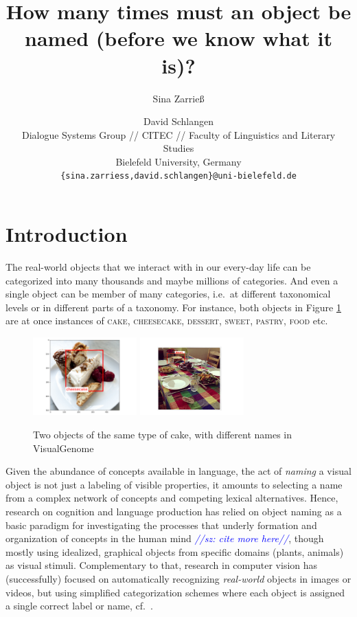 \documentclass[11pt]{article}
\title{How many times must an object be named (before we know what it is)?}
\author{Sina Zarrie{\ss}  \and David Schlangen\\
  Dialogue Systems Group // CITEC // Faculty of Linguistics and Literary Studies \\
 Bielefeld University, Germany \\
  {\tt \{sina.zarriess,david.schlangen\}@uni-bielefeld.de} \\}
\date{}
\newcommand{\sz}[1]{\textcolor{blue}{\emph{//sz: #1//}}}
\newcommand{\cat}[1]{\textsc{#1}}
\begin{document}
\maketitle

\begin{abstract}
\end{abstract}


\section{Introduction}

The real-world objects that we interact with in our every-day life can be categorized into many thousands and maybe millions of categories. And even a single object can be member of many categories, i.e.\ at different taxonomical levels or in different parts of a taxonomy. For instance, both objects in Figure \ref{fig:cake} are at once instances of \cat{cake}, \cat{cheesecake}, \cat{dessert}, \cat{sweet}, \cat{pastry}, \cat{food} etc.

\begin{figure}[htbp]
\begin{center}
\includegraphics[height=3cm]{Figures/cheescake.png}
\includegraphics[height=3cm]{Figures/cheesecak2.pdf}
\caption{Two objects of the same type of cake, with different names in VisualGenome}
\label{fig:cake}
\end{center}
\end{figure}


Given the abundance of concepts available in language, the act of \textit{naming} a visual object is not just a labeling of visible properties, it amounts to selecting a name from a complex network of concepts and competing lexical alternatives.
Hence, research on cognition and language production has relied on object naming as a basic paradigm for investigating the processes that underly formation and organization of concepts in the human mind  \cite{rosch1976basic} \sz{cite more here}, though mostly using idealized, graphical objects from specific domains (plants, animals) as visual stimuli.
Complementary to that, research in computer vision has (successfully) focused on automatically recognizing \textit{real-world} objects in images or videos, but using simplified categorization schemes where each object is assigned a single correct label or name, cf.\ \cite{googlenet}. %
\end{document}
